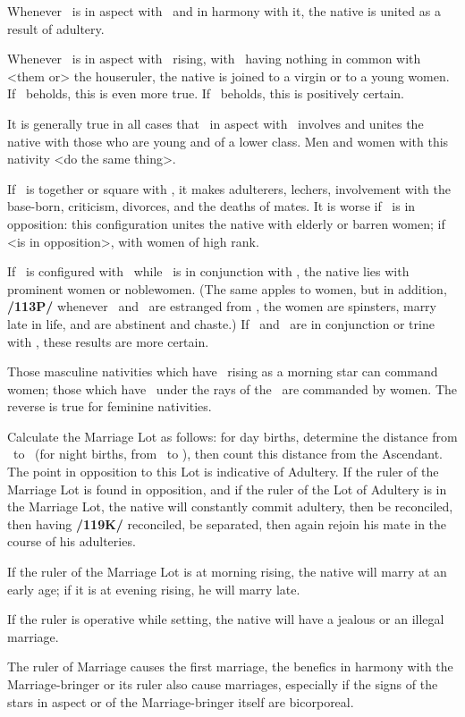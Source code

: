 Whenever \Mars\, is in aspect with \Venus\, and in harmony with it, the native is united as a result of adultery. 

Whenever \Mercury\, is in aspect with \Venus\, rising, with \Saturn\, having nothing in common with <them or> the houseruler, the native is joined to a virgin or to a young women. If \Mars\, beholds, this is even more true. If \Jupiter\, beholds, this is positively certain. 

It is generally true in all cases that \Mercury\, in aspect with \Venus\, involves and unites the native with those who are young and of a lower class. Men and women with this nativity <do the same thing>. 

If \Mars\, is together or square with \Venus, it makes adulterers, lechers, involvement with the base-born, criticism, divorces, and the deaths of mates. It is worse if \Saturn\, is in opposition: this configuration unites the native with elderly or barren women; if \Jupiter\, <is in opposition>, with women of high rank. 

If \Saturn\, is configured with \Jupiter\, while \Jupiter\, is in conjunction with \Venus, the native lies with prominent women or noblewomen. (The same apples to women, but in addition, \textbf{/113P/} whenever \Mars\, and \Mercury\, are estranged from \Venus, the women are spinsters, marry late in life, and are abstinent and chaste.)  If \Saturn\, and \Jupiter\, are in conjunction or trine with \Venus, these results are more certain. 

Those masculine nativities which have \Venus\, rising as a morning star can command women; those which have \Venus\, under the rays of the \Sun\, are commanded by women. The reverse is true for feminine nativities.

Calculate the Marriage Lot as follows: for day births, determine the distance from \Jupiter\, to \Venus\, (for night births, from \Venus\, to \Jupiter), then count this distance from the Ascendant. The point in opposition to this Lot is indicative of Adultery. If the ruler of the Marriage Lot is found in opposition, and if the ruler of the Lot of Adultery is in the Marriage Lot, the native will constantly commit adultery, then be reconciled, then having \textbf{/119K/} reconciled, be separated, then again rejoin his mate in the course of his adulteries. 

If the ruler of the Marriage Lot is at morning rising, the native will marry at an early age; if it is at evening rising, he will marry late. 

If the ruler is operative while setting, the native will have a jealous or an illegal marriage. 

The ruler of Marriage causes the first marriage, the benefics in harmony with the Marriage-bringer or its ruler also cause marriages, especially if the signs of the stars in aspect or of the Marriage-bringer itself are bicorporeal.


\newpage